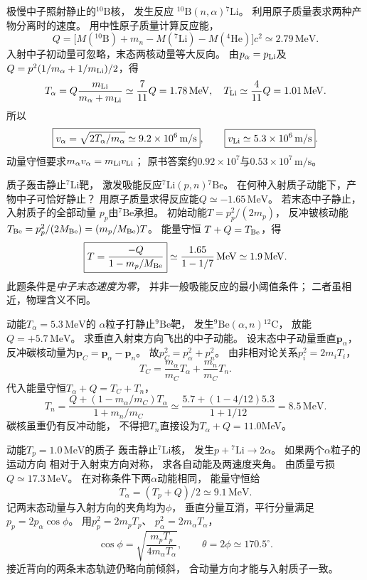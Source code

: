 极慢中子照射静止的$^{10}\mathrm B$核，
发生反应
$^{10}\mathrm B(n,\alpha){}^{7}\mathrm{Li}$。
利用原子质量表求两种产物分离时的速度。
\exsolution
用中性原子质量计算反应能，
\[
 Q=\bigl[M(^{10}\mathrm B)+m_n-
 M(^{7}\mathrm{Li})-M(^{4}\mathrm{He})\bigr]c^2
 \simeq2.79\,\mathrm{MeV}.
\]
入射中子初动量可忽略，末态两核动量等大反向。
由$p_\alpha=p_{\rm Li}$及
$Q=p^2(1/m_\alpha+1/m_{\rm Li})/2$，得
\[
 T_\alpha=Q\frac{m_{\rm Li}}{m_\alpha+m_{\rm Li}}
 \simeq\frac7{11}Q=1.78\,\mathrm{MeV},\quad
 T_{\rm Li}\simeq\frac4{11}Q=1.01\,\mathrm{MeV}.
\]
所以
\[
 \boxed{v_\alpha=\sqrt{2T_\alpha/m_\alpha}
 \simeq9.2\times10^6\,\mathrm{m/s}},\qquad
 \boxed{v_{\rm Li}\simeq5.3\times10^6\,\mathrm{m/s}}.
\]
\excheck 动量守恒要求$m_\alpha v_\alpha=m_{\rm Li}v_{\rm Li}$；
原书答案约$0.92\times10^7$与$0.53\times10^7\,\mathrm{m/s}$。

质子轰击静止$^{7}\mathrm{Li}$靶，
激发吸能反应$^{7}\mathrm{Li}(p,n){}^{7}\mathrm{Be}$。
在何种入射质子动能下，产物中子可恰好静止？
\exsolution
用原子质量求得反应能$Q\simeq-1.65\,\mathrm{MeV}$。
若末态中子静止，入射质子的全部动量
$p_p$由$^{7}\mathrm{Be}$承担。
初始动能$T=p_p^2/(2m_p)$，
反冲铍核动能$T_{\rm Be}=p_p^2/(2M_{\rm Be})
=(m_p/M_{\rm Be})T$。
能量守恒
$T+Q=T_{\rm Be}$，得
\[
 \boxed{T=\frac{-Q}{1-m_p/M_{\rm Be}}}
 \simeq\frac{1.65}{1-1/7}\,\mathrm{MeV}
 \simeq1.9\,\mathrm{MeV}.
\]
\excheck 此题条件是\emph{中子末态速度为零}，
并非一般吸能反应的最小阈值条件；
二者虽相近，物理含义不同。

动能$T_\alpha=5.3\,\mathrm{MeV}$的
$\alpha$粒子打静止$^{9}\mathrm{Be}$靶，
发生$^{9}\mathrm{Be}(\alpha,n){}^{12}\mathrm C$，
放能$Q=+5.7\,\mathrm{MeV}$。
求垂直入射束方向飞出的中子动能。
\exsolution
设末态中子动量垂直$\boldsymbol p_\alpha$，
反冲碳核动量为$\boldsymbol p_C=\boldsymbol p_\alpha-\boldsymbol p_n$。
故$p_C^2=p_\alpha^2+p_n^2$。
由非相对论关系$p_i^2=2m_iT_i$，
\[
 T_C=\frac{m_\alpha}{m_C}T_\alpha+
 \frac{m_n}{m_C}T_n.
\]
代入能量守恒$T_\alpha+Q=T_C+T_n$，
\[
 \boxed{T_n=
 \frac{Q+(1-m_\alpha/m_C)T_\alpha}
 {1+m_n/m_C}}
 \simeq\frac{5.7+(1-4/12)5.3}{1+1/12}
 =8.5\,\mathrm{MeV}.
\]
\excheck 碳核虽重仍有反冲动能，
不得把$T_n$直接设为$T_\alpha+Q=11.0$MeV。

动能$T_p=1.0\,\mathrm{MeV}$的质子
轰击静止$^{7}\mathrm{Li}$核，
发生$p+{}^{7}\mathrm{Li}\to2\alpha$。
如果两个$\alpha$粒子的运动方向
相对于入射束方向对称，
求各自动能及两速度夹角。
\exsolution
由质量亏损$Q\simeq17.3\,\mathrm{MeV}$。
在对称条件下两$\alpha$动能相同，
能量守恒给
\[
 \boxed{T_\alpha=(T_p+Q)/2\simeq9.1\,\mathrm{MeV}}.
\]
记两末态动量与入射方向的夹角均为$\phi$，
垂直分量互消，平行分量满足
$p_p=2p_\alpha\cos\phi$。
用$p_p^2=2m_pT_p$、
$p_\alpha^2=2m_\alpha T_\alpha$，
\[
 \cos\phi=
 \sqrt{\frac{m_pT_p}{4m_\alpha T_\alpha}},
 \qquad
 \boxed{\theta=2\phi\simeq170.5^\circ}.
\]
\excheck 接近背向的两条末态轨迹仍略向前倾斜，
合动量方向才能与入射质子一致。


